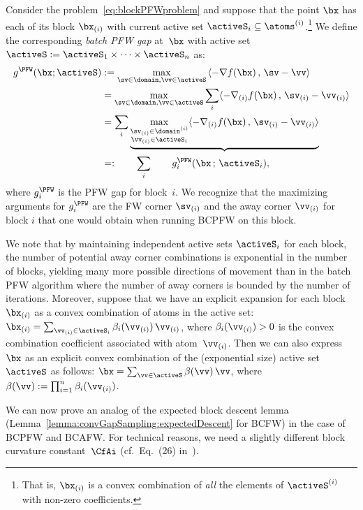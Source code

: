 \documentclass{article}
\begin{document}
\begin{definition} \label{def:blockPFW}
Consider the problem~\eqref{eq:blockPFWproblem} and suppose that the point $\bx$ has each
of its block $\bx_{(i)}$ with current active set $\activeS_i \subseteq \atoms^{(i)}$.\footnote{That is, $\bx_{(i)}$ is a convex combination of \emph{all} the elements of $\activeS^{(i)}$ with non-zero coefficients.}
We define the corresponding \emph{batch PFW gap} at~$\bx$ with active set $\activeS := \activeS_1 \times \cdots \times \activeS_n$ as:
\begin{align}
g^{\PFW}(\bx ; \activeS) &:= \max_{\sv \in \domain, \vv \in \activeS}  \,\langle -\nabla f(\bx) \,  , \, \sv - \vv  \rangle \label{eq:batchPFW} \\
&= \max_{\sv \in \domain, \vv \in \activeS}  \sum_i \langle  -\nabla_{(i)} f(\bx) \, , \, \sv_{(i)} - \vv_{(i)} \rangle \notag \\
&= \sum_i  \underbrace{\max_{\substack{ \sv_{(i)} \in \domain^{(i)} \\ \vv_{(i)} \in \activeS_i } } \langle   -\nabla_{(i)} f(\bx) \, , \, \sv_{(i)} - \vv_{(i)}\rangle} \notag \\
&=: \qquad   \sum_i \qquad g_i^\PFW(\bx \, ; \, \activeS_i) , \label{eq:blockPFW} 
\end{align}
where $g_i^\PFW$ is the PFW gap for block~$i$. We recognize that the maximizing arguments for $g_i^\PFW$ are the FW corner $\sv_{(i)}$ and the away corner $\vv_{(i)}$ for block $i$ that one would obtain when running BCPFW on this block.
\end{definition}

We note that by maintaining independent active sets $\activeS_i$ for each block, the number of potential away corner combinations is exponential in the number of blocks, yielding many more possible directions of movement than in the batch PFW algorithm where the number of away corners is bounded by the number of iterations. Moreover, suppose that we have an explicit expansion for each block $\bx_{(i)}$ as a convex combination of atoms in the active set: $\bx_{(i)} = \sum_{\vv_{(i)} \in \activeS_i} \beta_i(\vv_{(i)}) \, \vv_{(i)}$, where $\beta_i(\vv_{(i)}) > 0$ is the convex combination coefficient associated with atom~$\vv_{(i)}$. Then we can also express $\bx$ as an explicit convex combination of the (exponential size) active set $\activeS$ as follows:
$\bx = \sum_{\vv \in \activeS} \beta(\vv) \, \vv$, where $\beta(\vv) := \prod_{i=1}^n \beta_i(\vv_{(i)})$.

We can now prove an analog of the expected block descent lemma (Lemma~\ref{lemma:convGapSampling:expectedDescent} for BCFW) in the case of BCPFW and BCAFW\@. %
For technical reasons, we need a slightly different block curvature constant~$\CfAi$ (cf.~Eq.~(26) in~\citet{LacosteJulien2015linearFW}).
\end{document}
